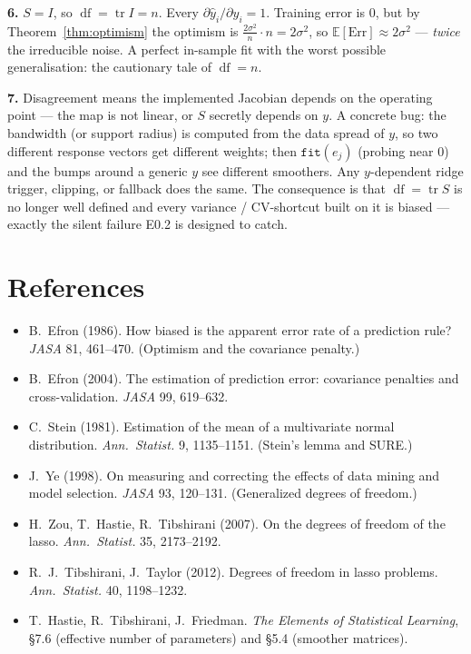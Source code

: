 \documentclass[11pt]{article}
\DeclareMathOperator{\tr}{tr}
\DeclareMathOperator{\df}{df}
\newcommand{\E}{\mathbb{E}}
\newcommand{\yhat}{\hat y}
\theoremstyle{definition}
\theoremstyle{plain}
\begin{document}
\textbf{6.} $S=I$, so $\df=\tr I=n$. Every $\partial\yhat_i/\partial y_i=1$.
Training error is $0$, but by Theorem~\ref{thm:optimism} the optimism is
$\tfrac{2\sigma^2}{n}\cdot n=2\sigma^2$, so $\E[\mathrm{Err}]\approx 2\sigma^2$ ---
\emph{twice} the irreducible noise. A perfect in-sample fit with the worst possible
generalisation: the cautionary tale of $\df=n$.

\textbf{7.} Disagreement means the implemented Jacobian depends on the operating
point --- the map is not linear, or $S$ secretly depends on $y$. A concrete bug: the
bandwidth (or support radius) is computed from the data spread of $y$, so two
different response vectors get different weights; then $\texttt{fit}(e_j)$ (probing
near $0$) and the bumps around a generic $y$ see different smoothers. Any
$y$-dependent ridge trigger, clipping, or fallback does the same. The consequence is
that $\df=\tr S$ is no longer well defined and every variance / CV-shortcut built on
it is biased --- exactly the silent failure E0.2 is designed to catch.

\section*{References}
\small
\begin{itemize}[leftmargin=1.4em,nosep]
\item B.\ Efron (1986). How biased is the apparent error rate of a prediction rule?
\emph{JASA} 81, 461--470. (Optimism and the covariance penalty.)
\item B.\ Efron (2004). The estimation of prediction error: covariance penalties and
cross-validation. \emph{JASA} 99, 619--632.
\item C.\ Stein (1981). Estimation of the mean of a multivariate normal distribution.
\emph{Ann.\ Statist.} 9, 1135--1151. (Stein's lemma and SURE.)
\item J.\ Ye (1998). On measuring and correcting the effects of data mining and model
selection. \emph{JASA} 93, 120--131. (Generalized degrees of freedom.)
\item H.\ Zou, T.\ Hastie, R.\ Tibshirani (2007). On the degrees of freedom of the
lasso. \emph{Ann.\ Statist.} 35, 2173--2192.
\item R.\ J.\ Tibshirani, J.\ Taylor (2012). Degrees of freedom in lasso problems.
\emph{Ann.\ Statist.} 40, 1198--1232.
\item T.\ Hastie, R.\ Tibshirani, J.\ Friedman. \emph{The Elements of Statistical
Learning}, \S 7.6 (effective number of parameters) and \S 5.4 (smoother matrices).
\end{itemize}
\end{document}
